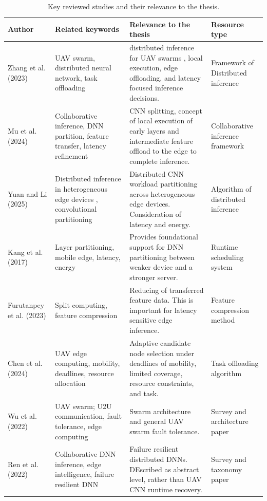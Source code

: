 \begin{table}[htbp]
	\centering
	\scriptsize
	\setlength{\tabcolsep}{4pt}
	\renewcommand{\arraystretch}{1.18}
	
	\begin{tabularx}{\textwidth}{|P{2.4cm}|P{3.0cm}|Y|P{2.4cm}|}
		\hline
		\textbf{Author} & \textbf{Related keywords} & \textbf{Relevance to the thesis} & \textbf{Resource type} \\
		\hline
		
		Zhang et al. (2023) &
		UAV swarm, distributed neural network, task offloading &
		distributed inference for UAV swarms , local execution, edge offloading, and latency focused inference decisions. &
		Framework of Distributed inference  \\
		\hline
		
		Mu et al. (2024) &
		Collaborative inference, DNN partition, feature transfer, latency refinement &
		CNN splitting, concept of local execution of early layers and intermediate feature offload to the edge to complete inference. &
		Collaborative inference framework \\
		\hline
		
		Yuan and Li (2025) &
		Distributed inference in heterogeneous edge devices , convolutional partitioning &
		Distributed CNN workload partitioning across heterogeneous edge devices. Consideration of latency and energy. &
		Algorithm of distributed inference  \\
		\hline
		
		Kang et al. (2017) &
		Layer partitioning, mobile edge, latency, energy &
		Provides foundational support for DNN partitioning between weaker device and a stronger server. &
		Runtime scheduling system \\
		\hline
		
		Furutanpey et al. (2023) &
		Split computing, feature compression &
		Reducing of transferred feature data. This is important for latency sensitive edge inference. &
		Feature compression method \\
		\hline
		
		Chen et al. (2024) &
		UAV edge computing, mobility, deadlines, resource allocation &
		Adaptive candidate node selection under deadlines of mobility, limited coverage, resource constraints, and task. &
		Task offloading algorithm \\
		\hline
		
		Wu et al. (2022) &
		UAV swarm; U2U communication, fault tolerance, edge computing &
		Swarm architecture and general UAV swarm fault tolerance.   &
		Survey and architecture paper \\
		\hline
		
		Ren et al. (2022) &
		Collaborative DNN inference, edge intelligence, failure resilient DNN &
		Failure resilient distributed DNNs. DEscribed as abstract level, rather than UAV CNN runtime recovery. &
		Survey and taxonomy paper \\
		\hline
		
	\end{tabularx}
	
	\caption{Key reviewed studies and their relevance to the thesis.}
	\label{tab:focused_literature_methodology}
\end{table}


